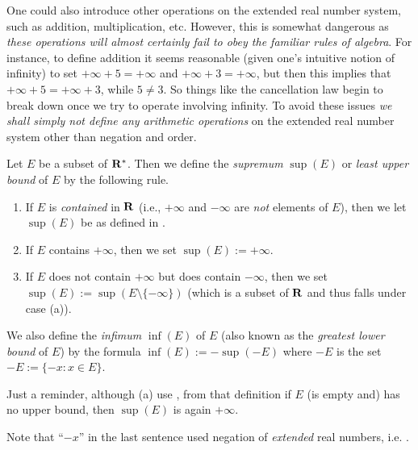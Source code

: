 \begin{note}
One could also introduce other operations on the extended real number system, such as addition, multiplication, etc.
However, this is somewhat dangerous as \emph{these operations will almost certainly fail to obey the familiar rules of algebra}.
For instance, to define addition it seems reasonable (given one’s intuitive notion of infinity) to set \(+\infty + 5 = +\infty\) and \(+\infty + 3 = +\infty\), but then this implies that \(+\infty + 5 = +\infty + 3\), while \(5 \neq 3\).
So things like the cancellation law begin to break down once we try to operate involving infinity.
To avoid these issues \emph{we shall simply not define any arithmetic operations} on the extended real number system other than negation and order.
\end{note}

\begin{definition}  \label{def 6.2.6}
Let \(E\) be a subset of \(\mathbf{R}^*\).
Then we define the \emph{supremum} \(\sup(E)\) or \emph{least upper bound} of \(E\) by the following rule.
\begin{enumerate}
    \item If \(E\) is \emph{contained} in \(\mathbf{R}\) (i.e., \(+\infty\) and \(-\infty\) are \emph{not} elements of \(E\)), then we let \(\sup(E)\) be as defined in .
    \item If \(E\) contains \(+\infty\), then we set \(\sup(E) := +\infty\).
    \item If \(E\) does not contain \(+\infty\) but does contain \(-\infty\), then we set \(\sup(E) := \sup(E \setminus \{-\infty\})\) (which is a subset of \(\mathbf{R}\) and thus falls under case (a)).
\end{enumerate}
We also define the \emph{infimum} \(\inf(E)\) of \(E\) (also known as the \emph{greatest lower bound} of \(E\)) by the formula \(\inf(E) := -\sup(-E)\)
where \(-E\) is the set \(-E := \{ -x : x \in E \}\).
\end{definition}

\begin{note}
Just a reminder, although (a) use , from that definition if \(E\) (is empty and) has no upper bound, then \(\sup(E)\) is again \(+\infty\).
\end{note}

\begin{note}
Note that ``\(-x\)'' in the last sentence used negation of \emph{extended} real numbers, i.e. .
\end{note}

